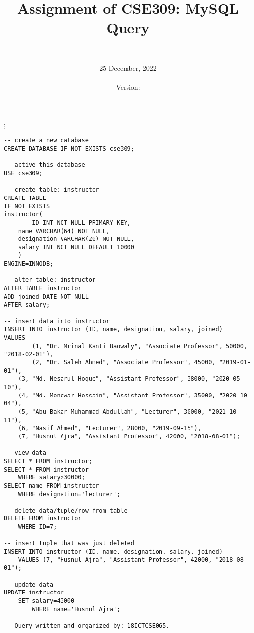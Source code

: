 \documentclass[10 pt]{article}
\title{Assignment of CSE309: MySQL Query}
\author
{
	\myName \\
	\href{mailto:\myMail}{\myMail}
}
\date{25 December, 2022 \\ \currenttime \\ Version: \version}
\affil
{
	\textbf{18ICTCSE065} \\
	BSMRSTU, Department of CSE \\
	{\tiny Copyright\faCopyright\hspace{2pt} under Sofiullah Book Agency}
}
\begin{document}
\maketitle
{};
\clearpage
\pagebreak
\pagecolor{white}

\begin{lstlisting}[caption={MySQL Query on cse309.instructor table.}]
-- create a new database
CREATE DATABASE IF NOT EXISTS cse309;

-- active this database
USE cse309;

-- create table: instructor
CREATE TABLE
IF NOT EXISTS
instructor(
		ID INT NOT NULL PRIMARY KEY,
    name VARCHAR(64) NOT NULL,
    designation VARCHAR(20) NOT NULL,
    salary INT NOT NULL DEFAULT 10000
    )
ENGINE=INNODB;

-- alter table: instructor
ALTER TABLE instructor
ADD joined DATE NOT NULL
AFTER salary;

-- insert data into instructor
INSERT INTO instructor (ID, name, designation, salary, joined)
VALUES
		(1, "Dr. Mrinal Kanti Baowaly", "Associate Professor", 50000, "2018-02-01"),
		(2, "Dr. Saleh Ahmed", "Associate Professor", 45000, "2019-01-01"),
    (3, "Md. Nesarul Hoque", "Assistant Professor", 38000, "2020-05-10"),
    (4, "Md. Monowar Hossain", "Assistant Professor", 35000, "2020-10-04"),
    (5, "Abu Bakar Muhammad Abdullah", "Lecturer", 30000, "2021-10-11"),
    (6, "Nasif Ahmed", "Lecturer", 28000, "2019-09-15"),
    (7, "Husnul Ajra", "Assistant Professor", 42000, "2018-08-01");
    
-- view data
SELECT * FROM instructor;
SELECT * FROM instructor
	WHERE salary>30000;
SELECT name FROM instructor
	WHERE designation='lecturer';
    
-- delete data/tuple/row from table
DELETE FROM instructor
	WHERE ID=7;
    
-- insert tuple that was just deleted
INSERT INTO instructor (ID, name, designation, salary, joined)
	VALUES (7, "Husnul Ajra", "Assistant Professor", 42000, "2018-08-01");
    
-- update data
UPDATE instructor
	SET salary=43000
		WHERE name='Husnul Ajra';

-- Query written and organized by: 18ICTCSE065.
\end{lstlisting}
\end{document}

